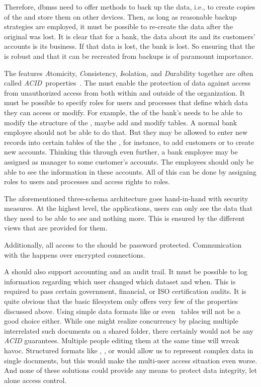 Therefore, \glspl{dbms} need to offer methods to back up the data, i.e., to create copies of the  and store them on other devices.
Then, as long as reasonable backup strategies are employed, it must be possible to re-create the data after the original  was lost.
It is clear that for a bank, the data about its and its customers' accounts is its business.
If that data is lost, the bank is lost.
So ensuring that the  is robust and that it can be recreated from backups is of paramount importance.%
\endhsection%

The features \emph{A}tomicity, \emph{C}onsistency, \emph{I}solation, and \emph{D}urability together are often called \emph{ACID}~properties~\cite{GR1992TPCAT,WV2001TISTAATPOCCAR}.
%
\label{sec:featuresDataPrivacyAndSecurity}%
The  must enable the protection of data against access from unauthorized access from both within and outside of the organization.
It must be possible to specify roles for users and processes that define which data they can access or modify.
For example, the  of the bank's  needs to be able to modify the structure of the , maybe add and modify tables.
A normal bank employee should not be able to do that.
But they may be allowed to enter new records into certain tables of the the , for instance, to add customers or to create new accounts.
Thinking this through even further, a bank employee may be assigned as manager to some customer's accounts.
The employees should only be able to see the information in these accounts.
All of this can be done by assigning roles to users and processes and access rights to roles.

The aforementioned three-schema architecture goes hand-in-hand with security measures.
At the highest level, the applications, users can only see the data that they need to be able to see and nothing more.
This is ensured by the different views that are provided for them.

Additionally, all access to the  should be password protected.
Communication with the  happens over encrypted connections.

A  should also support accounting and an audit trail.
It must be possible to log information regarding which user changed which dataset and when.
This is required to pass certain government, financial, or ISO certification audits.
\endhsection%
%
%
It is quite obvious that the basic filesystem only offers very few of the properties discussed above.
Using simple data formats like  or even \microsoftExcel\ tables will not be a good choice either.
While one might realize concurrency by placing multiple interrelated such documents on a shared folder, there certainly would not be any \emph{ACID} guarantees.
Multiple people editing them at the same time will wreak havoc.
Structured formats like , , or  would allow us to represent complex data in single documents, but this would make the multi-user access situation even worse.
And none of these solutions could provide any means to protect data integrity, let alone access control.

